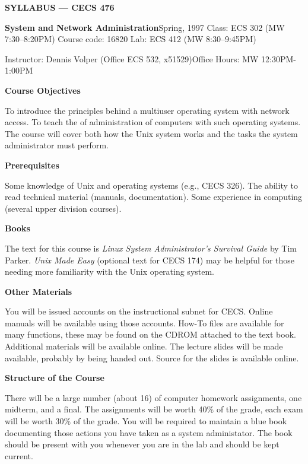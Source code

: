 \centerline{{\bf SYLLABUS --- CECS 476}}
\vskip 6pt
{\obeylines\parindent 0pt
{\bf System and Network Administration}\hfill Spring, 1997
Class: ECS 302 (MW 7:30--8:20PM) \hfill Course code: 16820 \hfill Lab: ECS 412 (MW 8:30--9:45PM)

Instructor: Dennis Volper (Office ECS 532, x51529)\hfill Office Hours: MW 12:30PM-1:00PM

}
 
\vskip 6pt
\centerline{\bf Course Objectives}
 
To introduce the principles behind a multiuser operating system with network
access.
To teach the of administration of computers with such operating systems.
The course will cover both how the Unix system works
and the tasks the system administrator must perform.

\vskip 6pt
\centerline{\bf Prerequisites }

Some knowledge of Unix and operating systems (e.g., CECS 326).
The ability to read technical material (manuals, documentation).
Some experience in computing (several upper division courses).
 
\vskip 6pt
\centerline{\bf Books }
 
The text for this course is 
{\it Linux System Administrator's Survival Guide}
by Tim Parker.
{\it Unix Made Easy} (optional text for CECS 174) may be helpful
for those needing more familiarity with the Unix operating system.

\vskip 6pt
\centerline{\bf Other Materials}

You will be issued accounts on the instructional subnet for CECS.
Online manuals will be available using those accounts.
How-To files are available for many functions, 
these may be found on the CDROM attached to the text book.
Additional materials will be available online.
The lecture slides will be made available, probably by being handed out.
Source for the slides is available online.

\vskip 6pt
\centerline{\bf Structure of the Course}
 
There will be a large number (about 16) of computer homework assignments, 
one midterm, and a final.
The assignments will be worth 40\% of the grade,
each exam will be worth 30\% of the grade.
You will be required to maintain a blue book documenting those actions
you have taken as a system administator.
The book should be present with you whenever you are in the lab
and should be kept current.
     
